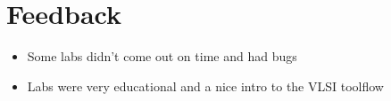 \section{Feedback}

\begin{itemize}
    \item Some labs didn't come out on time and had bugs
    \item Labs were very educational and a nice intro to the VLSI toolflow
\end{itemize}


